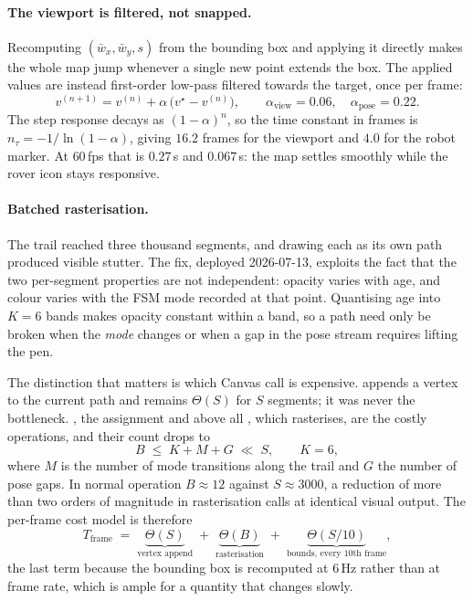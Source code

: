 \paragraph{The viewport is filtered, not snapped.} Recomputing
$(\bar{w}_x, \bar{w}_y, s)$ from the bounding box and applying it directly
makes the whole map jump whenever a single new point extends the box. The
applied values are instead first-order low-pass filtered towards the target,
once per frame:
\begin{equation}
v^{(n+1)} = v^{(n)} + \alpha\,\bigl(v^{\star} - v^{(n)}\bigr),
\qquad
\alpha_{\text{view}} = 0.06, \quad \alpha_{\text{pose}} = 0.22 .
\label{eq:viewportema}
\end{equation}
The step response decays as $(1-\alpha)^n$, so the time constant in frames is
$n_\tau = -1/\ln(1-\alpha)$, giving $16.2$ frames for the viewport and $4.0$
for the robot marker. At $60$\,fps that is $0.27$\,s and $0.067$\,s: the map
settles smoothly while the rover icon stays responsive.

\paragraph{Batched rasterisation.} The trail reached three thousand segments,
and drawing each as its own path produced visible stutter. The fix, deployed
2026-07-13, exploits the fact that the two per-segment properties are not
independent: opacity varies with age, and colour varies with the FSM mode
recorded at that point. Quantising age into $K = 6$ bands makes opacity
constant within a band, so a path need only be broken when the \emph{mode}
changes or when a gap in the pose stream requires lifting the pen.

The distinction that matters is which Canvas call is expensive.
 appends a vertex to the current path and remains
$\Theta(S)$ for $S$ segments; it was never the bottleneck.
, the  assignment and above all
, which rasterises, are the costly operations, and their count
drops to
\begin{equation}
B \;\le\; K + M + G \;\ll\; S,
\qquad K = 6,
\label{eq:batchcount}
\end{equation}
where $M$ is the number of mode transitions along the trail and $G$ the
number of pose gaps. In normal operation $B \approx 12$ against $S \approx
3000$, a reduction of more than two orders of magnitude in rasterisation
calls at identical visual output. The per-frame cost model is therefore
\begin{equation}
T_{\text{frame}} \;=\; \underbrace{\Theta(S)}_{\text{vertex append}}
   \;+\; \underbrace{\Theta(B)}_{\text{rasterisation}}
   \;+\; \underbrace{\Theta(S/10)}_{\text{bounds, every 10th frame}} ,
\label{eq:framecost}
\end{equation}
the last term because the bounding box is recomputed at $6$\,Hz rather than
at frame rate, which is ample for a quantity that changes slowly.

